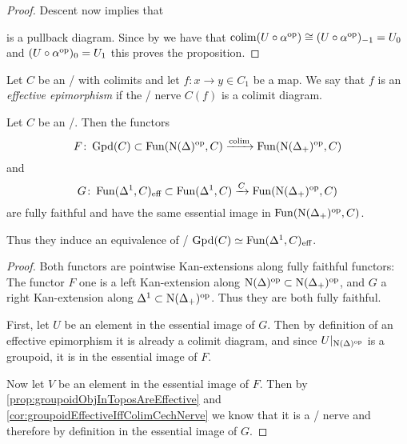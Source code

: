 \begin{prop}
\begin{proof}
        Descent now implies that 
        \begin{center}
        \end{center}
        is a pullback diagram.
        Since by %
        we have that $\operatorname{colim} (U\circ\alpha^{\operatorname{op}})\cong(U\circ\alpha^{\operatorname{op}})_{-1} = U_0$ and $(U\circ\alpha^{\operatorname{op}})_0=U_1$ this proves the proposition.
    \end{proof}
\end{prop}
\begin{definition}
    Let $C$ be an \inftycat/ with colimits and let $f\colon x\to y\in C_1$ be a map.
    We say that $f$ is an \emph{effective epimorphism} if the \Cech/ nerve $C(f)$ is a colimit diagram.
\end{definition}
\begin{prop}\label{prop:mayRecognitionTheoremGroupoid}
    Let $C$ be an \inftytop/. 
    Then the functors
    \begin{equation*}
        F\colon\operatorname{Gpd}(C)\subset\operatorname{Fun}(\operatorname{N}(\Delta)^{\operatorname{op}},C)\xrightarrow{\operatorname{colim}}\operatorname{Fun}(\operatorname{N}(\Delta_+)^{\operatorname{op}},C)
    \end{equation*}
    and 
    \begin{equation*}
        G\colon\operatorname{Fun}(\Delta^1,C)_{\text{eff}}\subset\operatorname{Fun}(\Delta^1,C)\xrightarrow{C}\operatorname{Fun}(\operatorname{N}(\Delta_+)^{\operatorname{op}},C)
    \end{equation*}
    are fully faithful and have the same essential image in $\operatorname{Fun}(\operatorname{N}(\Delta_+)^{\operatorname{op}},C)$.
    
    Thus they induce an equivalence of \inftycats/ $\operatorname{Gpd}(C)\simeq\operatorname{Fun}(\Delta^1,C)_{\text{eff}}$.
    \begin{proof}
        Both functors are pointwise Kan-extensions along fully faithful functors:
        The functor $F$ one is a left Kan-extension along $\operatorname{N}(\Delta)^{\operatorname{op}}\subset\operatorname{N}(\Delta_+)^{\operatorname{op}}$, and $G$ a right Kan-extension along $\Delta^1\subset\operatorname{N}(\Delta_+)^{\operatorname{op}}$.
        Thus they are both fully faithful.

        First, let $U$ be an element in the essential image of $G$. 
        Then by definition of an effective epimorphism it is already a colimit diagram, and since $U|_{\operatorname{N}(\Delta)^{\operatorname{op}}}$ is a groupoid, it is in the essential image of $F$.

        Now let $V$ be an element in the essential image of $F$. 
        Then by \cref{prop:groupoidObjInToposAreEffective} and \cref{cor:groupoidEffectiveIffColimCechNerve} we know that it is a \Cech/ nerve and therefore by definition in the essential image of $G$.
    \end{proof}
\end{prop}
